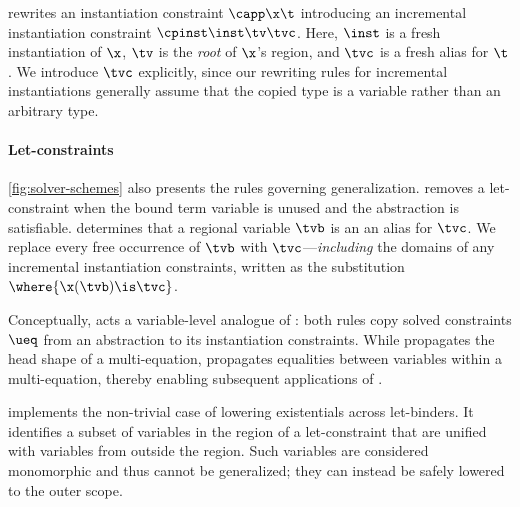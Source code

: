 \documentclass[acmsmall,screen,nonacm%
\Anonymous{,anonymous}{}%
\Final{}{,review}%
]{acmart}
\providecommand{\DIFaddbegin}{} %
\providecommand{\DIFaddend}{} %
\providecommand{\DIFdelbegin}{} %
\providecommand{\DIFdelend}{} %
\begin{document}
\DIFaddend {}

 rewrites an instantiation constraint $\capp \x \t$ introducing an
incremental instantiation constraint $\cpinst \inst \tv \tvc$. Here, $\inst$ is
a fresh instantiation of $\x$, $\tv$ is the \emph{root} of $\x$'s region, and
$\tvc$ is a fresh alias for $\t$. We introduce $\tvc$ explicitly, since our
rewriting rules for incremental instantiations generally assume that the copied
type is a variable rather than an arbitrary type.



\paragraph{Let-constraints}

\cref{fig:solver-schemes} also presents the rules governing generalization.
%
%
 removes a let-constraint when the bound term
variable is unused and the abstraction is satisfiable. 
determines that a regional variable $\tvb$ is an an alias for $\tvc$. We
replace every free occurrence of $\tvb$ with $\tvc$---\emph{including} the
domains of any incremental instantiation constraints, written as the
substitution $\where{\x(\tvb) \is \tvc}$.

Conceptually,  acts a variable-level analogue of
: both rules copy solved constraints $\ueq$ from an
abstraction to its instantiation constraints. While 
propagates the head shape of a multi-equation,  propagates
equalities between variables within a multi-equation, thereby enabling
subsequent applications of \DIFdelbegin %
\DIFdelend \DIFaddbegin {}\DIFaddend .


 implements the non-trivial case of lowering
existentials across let-binders. It identifies a subset of variables in
the region of a let-constraint that are unified with variables from
outside the region. Such variables are considered monomorphic and thus
cannot be generalized; they can instead be safely lowered to the outer
scope.

\end{document}

